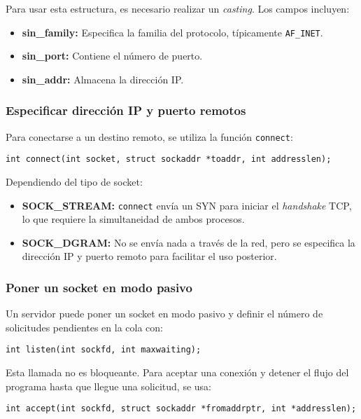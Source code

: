 \documentclass[a4paper,12pt]{article}
\begin{document}
Para usar esta estructura, es necesario realizar un \emph{casting}. Los campos incluyen:

\begin{itemize}
    \item \textbf{sin\_family:} Especifica la familia del protocolo, típicamente \texttt{AF\_INET}.
    \item \textbf{sin\_port:} Contiene el número de puerto.
    \item \textbf{sin\_addr:} Almacena la dirección IP.
\end{itemize}

\subsubsection{Especificar dirección IP y puerto remotos}

Para conectarse a un destino remoto, se utiliza la función \texttt{connect}:

\begin{verbatim}
int connect(int socket, struct sockaddr *toaddr, int addresslen);
\end{verbatim}

Dependiendo del tipo de socket:

\begin{itemize}
    \item \textbf{SOCK\_STREAM:} \texttt{connect} envía un SYN para iniciar el \emph{handshake} TCP, lo que requiere la simultaneidad de ambos procesos.
    \item \textbf{SOCK\_DGRAM:} No se envía nada a través de la red, pero se especifica la dirección IP y puerto remoto para facilitar el uso posterior.
\end{itemize}

\subsubsection{Poner un socket en modo pasivo}

Un servidor puede poner un socket en modo pasivo y definir el número de solicitudes pendientes en la cola con:

\begin{verbatim}
int listen(int sockfd, int maxwaiting);
\end{verbatim}

Esta llamada no es bloqueante. Para aceptar una conexión y detener el flujo del programa hasta que llegue una solicitud, se usa:

\begin{verbatim}
int accept(int sockfd, struct sockaddr *fromaddrptr, int *addresslen);
\end{verbatim}
\end{document}
